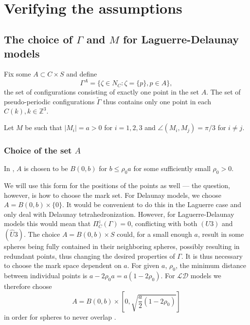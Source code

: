 \section{Verifying the assumptions}

\subsection{The choice of $\Gamma$ and $M$ for Laguerre-Delaunay models}\label{ref:MGamma}
Fix some $A \subset C\times S$ and define
$$\Gamma^A = \{\zeta \in N_C: \zeta = \{p\}, p \in A\},$$
the set of configurations consisting of exactly one point in the set $A$. The set of pseudo-periodic configurations $\tilde\Gamma$ thus contains only one point in each $C(k), k\in\mathbb Z^3$.

Let $M$ be such that $|M_i| = a > 0$ for $i=1,2,3$ and $\angle(M_i,M_j) = \pi / 3$ for $i\neq j$.

\subsubsection{Choice of the set $A$}
In \cite{DDG12}, $A$ is chosen to be $B(0,b)$ for $b\leq \rho_0 a$ for some  sufficiently small $\rho_0 >0$. 

We will use this form for the positions of the points as well --- the question, however, is how to choose the mark set. For Delaunay models, we choose $A=B(0,b)\times\{0\}$. It would be convenient to do this in the Laguerre case and only deal with Delaunay tetrahedronization. However, for Laguerre-Delaunay models this  would mean that $\Pi^z_C(\Gamma) = 0$, conflicting with both $(U3)$ and $(\hat U3)$. The choice $A=B(0,b)\times S$ could, for a small enough $a$, result in some spheres being fully contained in their neighboring spheres, possibly resulting in redundant points, thus changing the desired properties of $\Gamma$. It is thus necessary to choose the mark space dependent on $a$. For given $a$, $\rho_0$, the minimum distance between individual points is $a-2\rho_0 a = a(1-2\rho_0)$. For $\mathcal {LD}$ models we therefore choose 
$$A = B(0,b)\times \left[0, \sqrt{\frac a2(1-2\rho_0)}\right]$$ 
in order for spheres to never overlap . 




